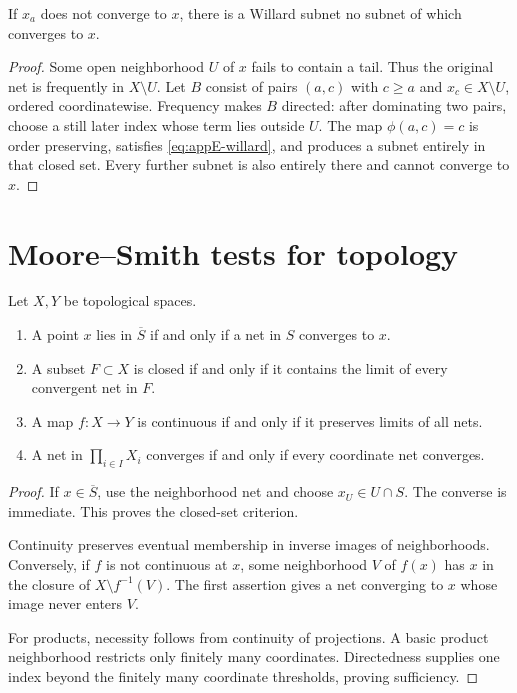 \begin{proposition}\label{prop:appE-divergence-subnet}
If \(x_a\) does not converge to \(x\), there is a Willard subnet no subnet of
which converges to \(x\).
\end{proposition}

\begin{proof}
Some open neighborhood \(U\) of \(x\) fails to contain a tail.
Thus the original net is frequently in \(X\setminus U\).
Let \(B\) consist of pairs \((a,c)\) with
\(c\geq a\) and \(x_c\in X\setminus U\), ordered coordinatewise.
Frequency makes \(B\) directed: after dominating two pairs, choose a still
later index whose term lies outside \(U\).  The map
\(\phi(a,c)=c\) is order preserving, satisfies
\eqref{eq:appE-willard}, and produces a subnet entirely in that closed set.
Every further subnet is also entirely there and cannot converge to \(x\).
\end{proof}

\section{Moore--Smith tests for topology}
\label{sec:appE-ms-tests}

\begin{theorem}\label{thm:appE-net-tests}
Let \(X,Y\) be topological spaces.
\begin{enumerate}
\item A point \(x\) lies in \(\overline S\) if and only if a net in \(S\)
      converges to \(x\).
\item A subset \(F\subset X\) is closed if and only if it contains the limit
      of every convergent net in \(F\).
\item A map \(f:X\to Y\) is continuous if and only if it preserves limits of
      all nets.
\item A net in \(\prod_{i\in I}X_i\) converges if and only if every
      coordinate net converges.
\end{enumerate}
\par
\end{theorem}

\begin{proof}
If \(x\in\overline S\), use the neighborhood net and choose
\(x_U\in U\cap S\).
The converse is immediate.
This proves the closed-set criterion.

Continuity preserves eventual membership in inverse images of
neighborhoods.
Conversely, if \(f\) is not continuous at \(x\), some neighborhood \(V\) of
\(f(x)\) has \(x\) in the closure of
\(X\setminus f^{-1}(V)\).
The first assertion gives a net converging to \(x\) whose image never enters
\(V\).

For products, necessity follows from continuity of projections.
A basic product neighborhood restricts only finitely many coordinates.
Directedness supplies one index beyond the finitely many coordinate
thresholds, proving sufficiency.
\end{proof}

